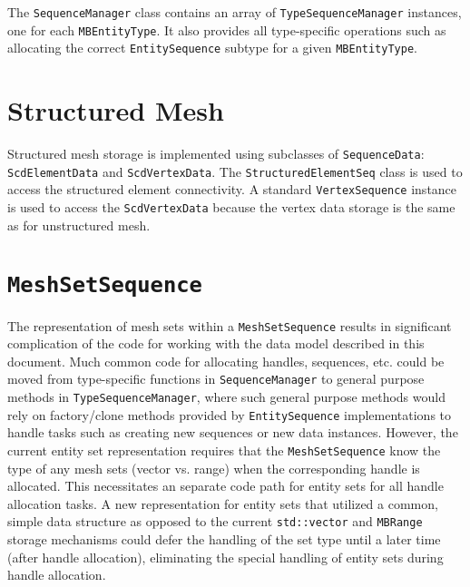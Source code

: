 \documentclass{report}
\begin{document}
The \texttt{SequenceManager} class contains an array of \texttt{TypeSequenceManager} instances, one for each \texttt{MBEntityType}.  It also provides all type-specific operations such as allocating the correct \texttt{EntitySequence} subtype for a given \texttt{MBEntityType}.  


\section{Structured Mesh}

Structured mesh storage is implemented using subclasses of \texttt{SequenceData}: \texttt{ScdElementData} and \texttt{ScdVertexData}. The \texttt{StructuredElementSeq} class is used to access the structured element connectivity.  A standard \texttt{VertexSequence} instance is used to access the \texttt{ScdVertexData} because the vertex data storage is the same as for unstructured mesh.

\section{\texttt{MeshSetSequence}}

The representation of mesh sets within a \texttt{MeshSetSequence} results in significant complication of the code for working with the data model described in this document.  Much common code for allocating handles, sequences, etc. could be moved from type-specific functions in \texttt{SequenceManager} to general purpose methods in \texttt{TypeSequenceManager}, where such general purpose methods would rely on factory/clone methods provided by \texttt{EntitySequence} implementations to handle tasks such as creating new sequences or new data instances.  However, the current entity set representation requires that the \texttt{MeshSetSequence} know the type of any mesh sets (vector vs. range) when the corresponding handle is allocated.  This necessitates an separate code path for entity sets for all handle allocation tasks.  A new representation for entity sets that utilized a common, simple data structure as opposed to the current \texttt{std::vector} and \texttt{MBRange} storage mechanisms could defer the handling of the set type until a later time (after handle allocation), eliminating the special handling of entity sets during handle allocation.
\end{document}
